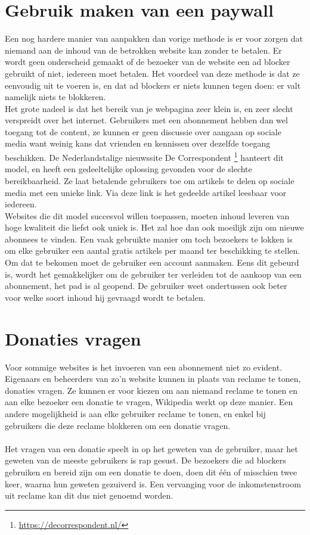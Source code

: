 \documentclass[pdftex,a4paper,12pt,twoside]{report}
\begin{document}
\section{Gebruik maken van een paywall}
\label{sec Gebruik maken van een paywall}
Een nog hardere manier van aanpakken dan vorige methode is er voor zorgen dat niemand aan de inhoud van de betrokken website kan zonder te betalen. Er wordt geen onderscheid gemaakt of de bezoeker van de website een ad blocker gebruikt of niet, iedereen moet betalen. Het voordeel van deze methode is dat ze eenvoudig uit te voeren is, en dat ad blockers er niets kunnen tegen doen: er valt namelijk niets te blokkeren.
\\
Het grote nadeel is dat het bereik van je webpagina zeer klein is, en zeer slecht verspreidt over het internet. Gebruikers met een abonnement hebben dan wel toegang tot de content, ze kunnen er geen discussie over aangaan op sociale media want weinig kans dat vrienden en kennissen over dezelfde toegang beschikken. De Nederlandstalige nieuwssite De Correspondent \footnote{\url{https://decorrespondent.nl/}} hanteert dit model, en heeft een gedeeltelijke oplossing gevonden voor de slechte bereikbaarheid. Ze laat betalende gebruikers toe om artikels te delen op sociale media met een unieke link. Via deze link is het gedeelde artikel leesbaar voor iedereen.
\\ 
Websites die dit model succesvol willen toepassen, moeten inhoud leveren van hoge kwaliteit die liefst ook uniek is. Het zal hoe dan ook moeilijk zijn om nieuwe abonnees te vinden. Een vaak gebruikte manier om toch bezoekers te lokken is om elke gebruiker een aantal gratis artikels per maand ter beschikking te stellen. Om dat te bekomen moet de gebruiker een account aanmaken. Eens dit gebeurd is, wordt het gemakkelijker om de gebruiker ter verleiden tot de aankoop van een abonnement, het pad is al geopend. De gebruiker weet ondertussen ook beter voor welke soort inhoud hij gevraagd wordt te betalen.


\section{Donaties vragen}
\label{sec Donaties vragen}
Voor sommige websites is het invoeren van een abonnement niet zo evident. Eigenaars en beheerders van zo'n website kunnen in plaats van reclame te tonen, donaties vragen. Ze kunnen er voor kiezen om aan niemand reclame te tonen en aan elke bezoeker een donatie te vragen, Wikipedia werkt op deze manier. Een andere mogelijkheid is aan elke gebruiker reclame te tonen, en enkel bij gebruikers die deze reclame blokkeren om een donatie vragen.
\\
\\
Het vragen van een donatie speelt in op het geweten van de gebruiker, maar het geweten van de meeste gebruikers is rap gesust. De bezoekers die ad blockers gebruiken en bereid zijn om een donatie te doen, doen dit één of misschien twee keer, waarna hun geweten gezuiverd is. Een vervanging voor de inkomstenstroom uit reclame kan dit dus niet genoemd worden.
\end{document}
